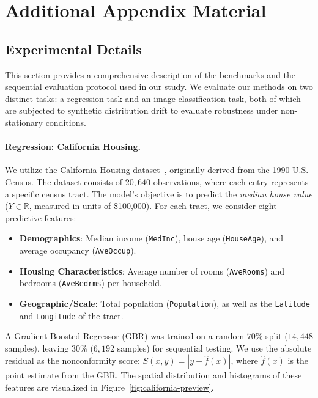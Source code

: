 \documentclass{uai2026} %
\newcommand{\1}{\mathbf{1}}
\begin{document}
\section{Additional Appendix Material}
\label{app:additional_material}

\subsection{Experimental Details}
\label{app:extra_experiments}

This section provides a comprehensive description of the benchmarks and the sequential evaluation protocol used in our study. We evaluate our methods on two distinct tasks: a regression task and an image classification task, both of which are subjected to synthetic distribution drift to evaluate robustness under non-stationary conditions.

\paragraph{Regression: California Housing.}
We utilize the California Housing dataset~\citep{california_housing}, originally derived from the 1990 U.S. Census. The dataset consists of $20{,}640$ observations, where each entry represents a specific census tract. The model's objective is to predict the \emph{median house value} ($Y \in \mathbb{R}$, measured in units of \$100{,}000). For each tract, we consider eight predictive features:
\begin{itemize}
  \item \textbf{Demographics}: Median income (\texttt{MedInc}), house age (\texttt{HouseAge}), and average occupancy (\texttt{AveOccup}).
  \item \textbf{Housing Characteristics}: Average number of rooms (\texttt{AveRooms}) and bedrooms (\texttt{AveBedrms}) per household.
  \item \textbf{Geographic/Scale}: Total population (\texttt{Population}), as well as the \texttt{Latitude} and \texttt{Longitude} of the tract.
\end{itemize}

A Gradient Boosted Regressor (GBR) was trained on a random $70\%$ split ($14{,}448$ samples), leaving $30\%$ ($6{,}192$ samples) for sequential testing. We use the absolute residual as the nonconformity score: $S(x,y) = |y - \hat{f}(x)|$, where $\hat{f}(x)$ is the point estimate from the GBR. The spatial distribution and histograms of these features are visualized in Figure~\ref{fig:california-preview}.
\end{document}
